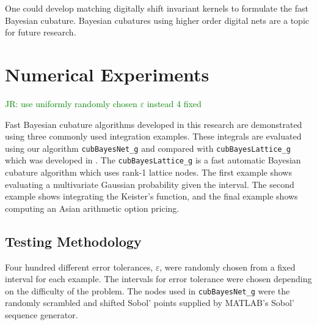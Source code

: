 \documentclass{svjour3}                     %
\newcommand{\code}[1]{\texttt{#1}}
\newcommand{\JRNote}[1]{{\textcolor{green}{JR: #1}}}
\begin{document}
One could develop matching digitally shift invariant kernels to formulate the fast Bayesian cubature. Bayesian cubatures using higher order digital nets are a topic for future research.
























\section{Numerical Experiments}

\label{sec:NumExp}

\JRNote{use uniformly randomly chosen $\varepsilon$ instead 4 fixed}

Fast Bayesian cubature algorithms developed in this research are demonstrated using three commonly used integration examples.
These integrals are evaluated using our algorithm \code{cubBayesNet\_g} and compared with \code{cubBayesLattice\_g} which was developed in \cite{JagHic19a}. The \code{cubBayesLattice\_g} is a fast automatic Bayesian cubature algorithm which uses rank-1 lattice nodes. The first example shows evaluating a multivariate Gaussian probability given the interval. The second example shows integrating the Keister's function, and the final example shows computing an Asian arithmetic option pricing.  


\subsection{Testing Methodology}
\label{sec:numerical_experiments_cubBayesLattice}

Four hundred different error tolerances, $\varepsilon$, were randomly chosen from a fixed interval  for each example. 
The intervals for error tolerance were chosen depending on the difficulty of the problem.
The nodes used in \code{cubBayesNet\_g} were the randomly scrambled and shifted Sobol' points supplied by MATLAB's Sobol' sequence generator. 
\end{document}
